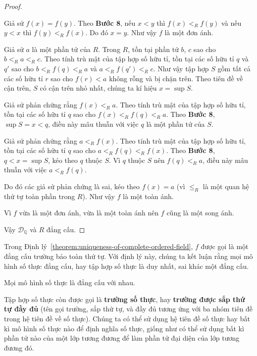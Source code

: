 \begin{proof}
\begin{enumerate}[label={\textbf{Bước \arabic*.}},itemindent=1cm,start=8]
              Giả sử $f(x) = f(y)$. Theo \textbf{Bước 8}, nếu $x < y$ thì $f(x) <_{R} f(y)$ và nếu $y < x$ thì $f(y) <_{R} f(x)$. Do đó $x = y$. Như vậy $f$ là một đơn ánh.

              Giả sử $a$ là một phần tử của $R$. Trong $R$, tồn tại phần tử $b$, $c$ sao cho $b <_{R} a <_{R} c$. Theo tính trù mật của tập hợp số hữu tỉ, tồn tại các số hữu tỉ $q$ và $q'$ sao cho $b <_{R} f(q) <_{R} a$ và $a <_{R} f(q') <_{R} c$. Như vậy tập hợp $S$ gồm tất cả các số hữu tỉ $r$ sao cho $f(r) < a$ không rỗng và bị chặn trên. Theo tiên đề về cận trên, $S$ có cận trên nhỏ nhất, chúng ta kí hiệu $x = \sup S$.

              Giả sử phản chứng rằng $f(x) <_{R} a$. Theo tính trù mật của tập hợp số hữu tỉ, tồn tại các số hữu tỉ $q$ sao cho $f(x) <_{R} f(q) <_{R} a$. Theo \textbf{Bước 8}, $\sup S = x < q$, điều này mâu thuẫn với việc $q$ là một phần tử của $S$.

              Giả sử phản chứng rằng $a <_{R} f(x)$. Theo tính trù mật của tập hợp số hữu tỉ, tồn tại các số hữu tỉ $q$ sao cho $a <_{R} f(q) <_{R} f(x)$. Theo \textbf{Bước 8}, $q < x = \sup S$, kéo theo $q$ thuộc $S$. Vì $q$ thuộc $S$ nên $f(q) <_{R} a$, điều này mâu thuẫn với việc $a <_{R} f(q)$.

              Do đó các giả sử phản chứng là sai, kéo theo $f(x) = a$ (vì $\leq_{R}$ là một quan hệ thứ tự toàn phần trong $R$). Như vậy $f$ là một toàn ánh.

              Vì $f$ vừa là một đơn ánh, vừa là một toàn ánh nên $f$ cũng là một song ánh.
    \end{enumerate}

    Vậy $\mathscr{D}_{\mathbb{Q}}$ và $R$ đẳng cấu.
\end{proof}

Trong Định lý~\ref{theorem:uniqueness-of-complete-ordered-field}, $f$ được gọi là một đẳng cấu trường bảo toàn thứ tự. Với định lý này, chúng ta kết luận rằng mọi mô hình số thực đẳng cấu, hay tập hợp số thực là duy nhất, sai khác một đẳng cấu.

\begin{theorem}
    Mọi mô hình số thực là đẳng cấu với nhau.
\end{theorem}

Tập hợp số thực còn được gọi là \textbf{trường số thực}, hay \textbf{trường được sắp thứ tự đầy đủ} (tên gọi trường, sắp thứ tự, và đầy đủ tương ứng với ba nhóm tiên đề trong hệ tiên đề về số thực). Chúng ta có thể sử dụng hệ tiên đề số thực hay bất kì mô hình số thực nào để định nghĩa số thực, giống như có thể sử dụng bất kì phần tử nào của một lớp tương đương để làm phần tử đại diện của lớp tương đương đó.

